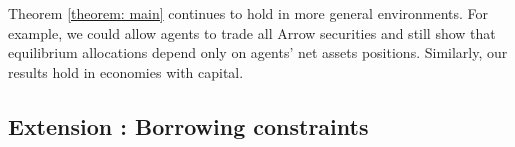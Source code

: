 \documentclass[thmsb,11pt]{article}
\begin{document}
Theorem \ref{theorem: main} continues to hold in more general environments. For example, we could allow
agents to trade all  Arrow securities and still show that  equilibrium
allocations depend only on agents' net assets positions.
Similarly, our results   hold in  economies with capital.
% 

\subsection{Extension : Borrowing constraints}\label{Sec: extensions}
%
\end{document}
